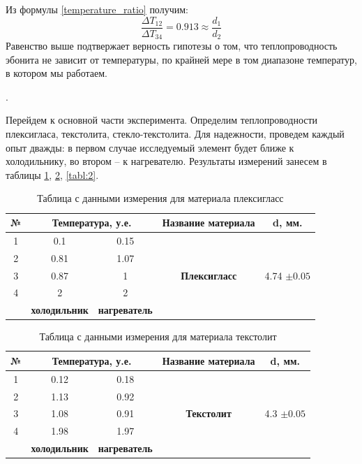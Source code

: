 \documentclass[a4paper, 12pt]{article}
\newcounter{Points}
\newcommand{\point}{\arabic{Points}. \addtocounter{Points}{1}}
\begin{document}
Из формулы \ref{temperature_ratio} получим:
$$ \frac{\Delta T_{12}}{\Delta T_{34}} = 0.913 \approx \frac{d_1}{d_2}$$
Равенство выше подтвержает верность гипотезы о том, что теплопроводность эбонита не зависит от температуры, по крайней мере в том диапазоне температур, в котором мы работаем.

\point Перейдем к основной части эксперимента. Определим теплопроводности плексигласа, текстолита, стекло-текстолита. Для надежности, проведем каждый опыт дважды: в первом случае исследуемый элемент будет ближе к холодильнику, во втором -- к нагревателю. Результаты измерений занесем в таблицы \ref{tabl:0}, \ref{tabl:1}, \ref{tabl:2}.

\begin{table}[h]
    \centering
    \begin{tabular}{|c|c|c|c|c|}
    
    \hline
    №	&	\multicolumn{2}{c}{Температура,	у.е.}	&	Название	материала	&	d,	мм.	\\\hline
    
    1	&	0.1	&	0.15	&	
    &	\\\cline{1-3}
    2	&	0.81	&	1.07	&	
    \multirow{3}{*}{\textbf{Плексигласс}}	&	\multirow{3}{*}{4.74	$\pm	0.05$}	\\\cline{1-3}
    
    3	&	0.87	&	1	&	
    &	\\\cline{1-3}
    4	&	2	&	2	&	
    &	\\\cline{1-3}
        &	\textbf{холодильник}	&	\textbf{нагреватель}	&	&
    \\\hline
    \end{tabular}
    
    \caption{Таблица с данными измерения для материала плексигласс}
    \label{tabl:0}
    \end{table}
    \begin{table}[h]
    \centering
    \begin{tabular}{|c|c|c|c|c|}
    
    \hline
    №	&	\multicolumn{2}{c}{Температура,	у.е.}	&	Название	материала	&	d,	мм.	\\\hline
    
    1	&	0.12	&	0.18	&	
    &	\\\cline{1-3}
    2	&	1.13	&	0.92	&	
    \multirow{3}{*}{\textbf{Текстолит}}	&	\multirow{3}{*}{4.3	$\pm	0.05$}	\\\cline{1-3}
    
    3	&	1.08	&	0.91	&	
    &	\\\cline{1-3}
    4	&	1.98	&	1.97	&	
    &	\\\cline{1-3}
        &	\textbf{холодильник}	&	\textbf{нагреватель}	&	&
    \\\hline
    \end{tabular}
    
    \caption{Таблица с данными измерения для материала текстолит}
    \label{tabl:1}
    \end{table}
\end{document}
